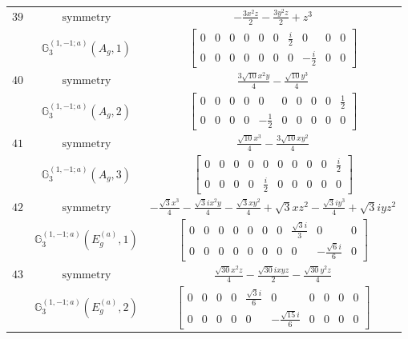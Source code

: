 \documentclass[fleqn,8pt,landscape]{jsarticle}
\begin{document}
\begin{longtable}{ccc}
$ 39 $ & $ \text{symmetry} $ & $ - \frac{3 x^{2} z}{2} - \frac{3 y^{2} z}{2} + z^{3} $ \\
$  $ & $ \mathbb{G}_{3}^{(1,-1;a)}(A_{g},1) $ & $ \begin{bmatrix} 0 & 0 & 0 & 0 & 0 & 0 & \frac{i}{2} & 0 & 0 & 0 \\ 0 & 0 & 0 & 0 & 0 & 0 & 0 & - \frac{i}{2} & 0 & 0 \end{bmatrix} $ \\ \hline
$ 40 $ & $ \text{symmetry} $ & $ \frac{3 \sqrt{10} x^{2} y}{4} - \frac{\sqrt{10} y^{3}}{4} $ \\
$  $ & $ \mathbb{G}_{3}^{(1,-1;a)}(A_{g},2) $ & $ \begin{bmatrix} 0 & 0 & 0 & 0 & 0 & 0 & 0 & 0 & 0 & \frac{1}{2} \\ 0 & 0 & 0 & 0 & - \frac{1}{2} & 0 & 0 & 0 & 0 & 0 \end{bmatrix} $ \\ \hline
$ 41 $ & $ \text{symmetry} $ & $ \frac{\sqrt{10} x^{3}}{4} - \frac{3 \sqrt{10} x y^{2}}{4} $ \\
$  $ & $ \mathbb{G}_{3}^{(1,-1;a)}(A_{g},3) $ & $ \begin{bmatrix} 0 & 0 & 0 & 0 & 0 & 0 & 0 & 0 & 0 & \frac{i}{2} \\ 0 & 0 & 0 & 0 & \frac{i}{2} & 0 & 0 & 0 & 0 & 0 \end{bmatrix} $ \\ \hline
$ 42 $ & $ \text{symmetry} $ & $ - \frac{\sqrt{3} x^{3}}{4} - \frac{\sqrt{3} i x^{2} y}{4} - \frac{\sqrt{3} x y^{2}}{4} + \sqrt{3} x z^{2} - \frac{\sqrt{3} i y^{3}}{4} + \sqrt{3} i y z^{2} $ \\
$  $ & $ \mathbb{G}_{3}^{(1,-1;a)}(E_{g}^{(a)},1) $ & $ \begin{bmatrix} 0 & 0 & 0 & 0 & 0 & 0 & 0 & \frac{\sqrt{3} i}{3} & 0 & 0 \\ 0 & 0 & 0 & 0 & 0 & 0 & 0 & 0 & - \frac{\sqrt{6} i}{6} & 0 \end{bmatrix} $ \\ \hline
$ 43 $ & $ \text{symmetry} $ & $ \frac{\sqrt{30} x^{2} z}{4} - \frac{\sqrt{30} i x y z}{2} - \frac{\sqrt{30} y^{2} z}{4} $ \\
$  $ & $ \mathbb{G}_{3}^{(1,-1;a)}(E_{g}^{(a)},2) $ & $ \begin{bmatrix} 0 & 0 & 0 & 0 & \frac{\sqrt{3} i}{6} & 0 & 0 & 0 & 0 & 0 \\ 0 & 0 & 0 & 0 & 0 & - \frac{\sqrt{15} i}{6} & 0 & 0 & 0 & 0 \end{bmatrix} $ \\ \hline

\end{longtable}
\end{document}
